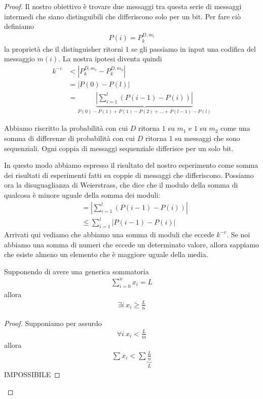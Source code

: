 \begin{proof}
Il nostro obiettivo è trovare due messaggi tra questa serie di messaggi intermedi che siano distinguibili che differiscono solo per un bit. Per fare ciò definiamo
\begin{align*}
    P(i) = P_k^{D, m_i}
\end{align*}
\noindent la proprietà che il distinguisher ritorni $1$ se gli passiamo in input una codifica del messaggio $m(i)$. La nostra ipotesi diventa quindi
\begin{align*}
    k^{-c} &< \left|P_{k}^{D, m_1} - P_{k}^{D, m_2}\right|\\
            &= \left|P(0) - P(l)\right|\\
            &= \underbrace{\left|\sum^l _{i=1}(P(i-1) - P(i))\right|}_{P(0) - P(1)
                                                        + P(1) - P(2)
                                                        + ...
                                                        + P(l-1) - P(l)}
\end{align*}

\noindent Abbiamo riscritto la probabilità con cui $D$ ritorna $1$ su $m_1$ e $1$ su $m_2$ come una somma di differenze di probabilità con cui $D$ ritorna $1$ su messaggi che sono sequenziali. Ogni coppia di messaggi sequenziale differisce per un solo bit. 

In questo modo abbiamo espresso il risultato del nostro esperimento come somma dei risultati di esperimenti fatti su coppie di messaggi che differiscono. Possiamo ora la disuguaglianza di Weierstrass, che dice che il modulo della somma di qualcosa è minore uguale della somma dei moduli:
\begin{align*}
    &= \left|\sum^l _{i=1}(P(i-1) - P(i))\right|\\
    &\le \sum^l_{i=1} \left| P(i-1) - P(i)\right|
\end{align*}
\indent Arrivati qui vediamo che abbiamo una somma di moduli che eccede $k^{-c}$. Se noi abbiamo una somma di numeri che eccede un determinato valore, allora sappiamo che esiste almeno un elemento che è maggiore uguale della media. 

\begin{definition}
Supponendo di avere una generica sommatoria 
\begin{align*}
    \sum^n_{i=0} x_i = L
\end{align*}
\noindent allora 
\begin{align*}
    \exists i \ x_i \ge \frac{L}{n}
\end{align*}
\end{definition}
\begin{proof}
Supponiamo per assurdo
\begin{align*}
    \forall i \ x_i < \frac{L}{m}
\end{align*}
\noindent allora
\begin{align*}
    \sum x_i < \sum \underbrace{\frac{L}{n}}_{L} 
\end{align*}
\noindent IMPOSSIBILE
\end{proof}


\end{proof}
